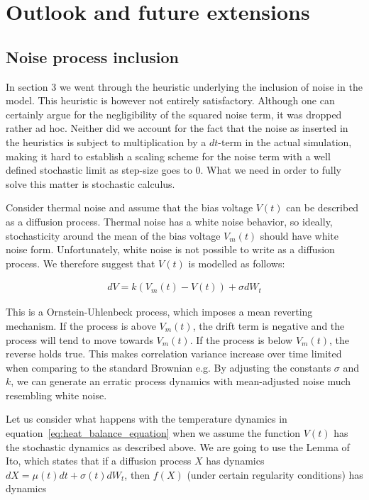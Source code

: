 \section{Outlook and future extensions}
\subsection{Noise process inclusion}
In section 3 we went through the heuristic underlying the inclusion of noise in the model. This heuristic is however not entirely satisfactory. Although one can certainly argue for the negligibility of the squared noise term, it was dropped rather ad hoc. Neither did we account for the fact that the noise as inserted in the heuristics is subject to multiplication by a $dt$-term in the actual simulation, making it hard to establish a scaling scheme for the noise term with a well defined stochastic limit as step-size goes to 0. What we need in order to fully solve this matter is stochastic calculus.

Consider thermal noise and assume that the bias voltage $V(t)$ can be described as a diffusion process. Thermal noise has a white noise behavior, so ideally, stochasticity around the mean of the bias voltage $V_{m}(t)$ should have white noise form. Unfortunately, white noise is not possible to write as a diffusion process. We therefore suggest that $V(t)$ is modelled as follows:

\begin{align*}
d V = k(V_{m}(t)-V(t)) + \sigma dW_{t}
\end{align*}

This is a Ornstein-Uhlenbeck process, which imposes a mean reverting mechanism. If the process is above $V_m(t)$, the drift term is negative and the process will tend to move towards $V_m(t)$. If the process is below $V_m(t)$, the reverse holds true. This makes correlation variance increase over time limited when comparing to the standard Brownian e.g. By adjusting the constants $\sigma$ and $k$, we can generate an erratic process dynamics with mean-adjusted noise much resembling white noise.

Let us consider what happens with the temperature dynamics in equation~\eqref{eq:heat_balance_equation} when we assume the function $V(t)$ has the stochastic dynamics as described above.
We are going to use the Lemma of Ito, which states that if a diffusion process $X$ has dynamics $dX = \mu(t)dt + \sigma(t)dW_{t}$, then $f(X)$ (under certain regularity conditions) has dynamics

